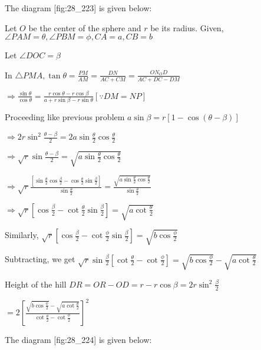 \item The diagram [fig:28_223] is given below:

  \startplacefigure[reference=fig:28_223]
    \externalfigure[28_223.pdf]
  \stopplacefigure

  Let $O$ be the center of the sphere and $r$ be its radius. Given, $\angle PAM =
  \theta, \angle PBM = \phi, CA = a, CB = b$

  Let $\angle DOC = \beta$

  In $\triangle PMA, \tan\theta = \frac{PM}{AM} = \frac{DN}{AC + CM} = \frac{ON _ OD}{AC + DC -
    DM}$

  $\Rightarrow \frac{\sin\theta}{\cos\theta} = \frac{r\cos\theta - r\cos\beta}{a + r\sin\beta -
    r\sin\theta} [\because DM = NP]$

  Proceeding like previous problem $a\sin\beta = r[1 - \cos(\theta - \beta)]$

  $\Rightarrow 2r\sin^2\frac{\theta - \beta}{2} = 2a\sin\frac{\theta}{2}\cos\frac{\theta}{2}$

  $\Rightarrow \sqrt{r}\sin\frac{\theta - \beta}{2} =
  \sqrt{a\sin\frac{\theta}{2}\cos\frac{\theta}{2}}$

  $\Rightarrow \sqrt{r}\frac{\left[\sin\frac{\theta}{2}\cos\frac{\beta}{2} -
      \cos\frac{\theta}{2}\sin\frac{\beta}{2}\right]}{\sin\frac{\theta}{2}} =
  \frac{\sqrt{a\sin\frac{\theta}{2}\cos\frac{\theta}{2}}}{\sin\frac{\theta}{2}}$

  $\Rightarrow \sqrt{r}\left[\cos\frac{\beta}{2} - \cot\frac{\theta}{2}\sin\frac{\beta}{2}\right] =
  \sqrt{a\cot\frac{\theta}{2}}$

  Similarly, $\sqrt{r}\left[\cos\frac{\beta}{2} - \cot\frac{\phi}{2}\sin\frac{\beta}{2}\right] =
  \sqrt{b\cos\frac{\phi}{2}}$

  Subtracting, we get $\sqrt{r}\sin\frac{\beta}{2}\left[\cot\frac{\theta}{2} -
    \cot\frac{\phi}{2}\right] = \sqrt{b\cos\frac{\phi}{2}} - \sqrt{a\cot\frac{\theta}{2}}$

  Height of the hill $DR = OR - OD = r - r\cos\beta = 2r\sin^2\frac{\beta}{2}$

  $= 2\left[\frac{\sqrt{b\cos\frac{\phi}{2}} - \sqrt{a\cot\frac{\theta}{2}}}{\cot\frac{\theta}{2} -
      \cot\frac{\phi}{2}}\right]^2$

\item The diagram [fig:28_224] is given below:

  \startplacefigure[reference=fig:28_224]
    \externalfigure[28_224.pdf]
  \stopplacefigure

